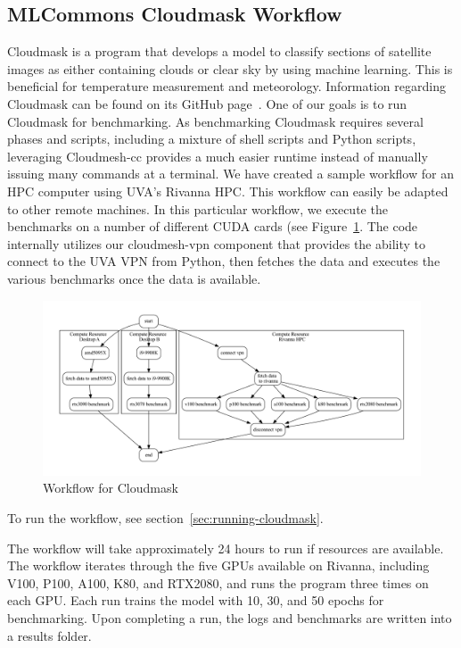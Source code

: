 
\subsection{MLCommons Cloudmask Workflow}
\label{cloudmask-workflow}

Cloudmask is a program that develops a model to classify sections of
satellite images as either containing clouds or clear sky by using
machine learning. This is beneficial for temperature measurement and
meteorology.  Information regarding Cloudmask can be found on its
GitHub page~\cite{www-cloudmask}.
One of our goals is to run Cloudmask for benchmarking.
As benchmarking Cloudmask requires
several phases and scripts, including a mixture of shell scripts and
Python scripts, leveraging Cloudmesh-cc provides a much easier runtime
instead of manually issuing many commands at a terminal.
We have created a sample workflow for an HPC
computer using UVA's Rivanna HPC. 
This workflow can easily be adapted to other remote machines. In this
particular workflow, we execute the benchmarks on a number of different
CUDA cards (see Figure~\ref{fig:cloudmaskwf}. The code internally utilizes
our cloudmesh-vpn component that provides the ability to
connect to the UVA VPN from Python, then fetches the data and executes
the various benchmarks once the data is available.

\begin{figure}[htb]
\centering
\includegraphics[width=1.0\columnwidth]{images/cloudmask-wf.pdf}
\vspace{-1cm}
\caption{Workflow for Cloudmask}\label{fig:cloudmaskwf}
\end{figure}


To run the workflow, see section~\ref{sec:running-cloudmask}.

The workflow will take approximately 24 hours to run if resources are
available. The workflow iterates through the five GPUs available on
Rivanna, including V100, P100, A100, K80, and RTX2080, and runs the program
three times on each GPU. Each run trains the model with 10, 30, and 50
epochs for benchmarking. Upon completing a run, the logs and
benchmarks are written into a results folder.

